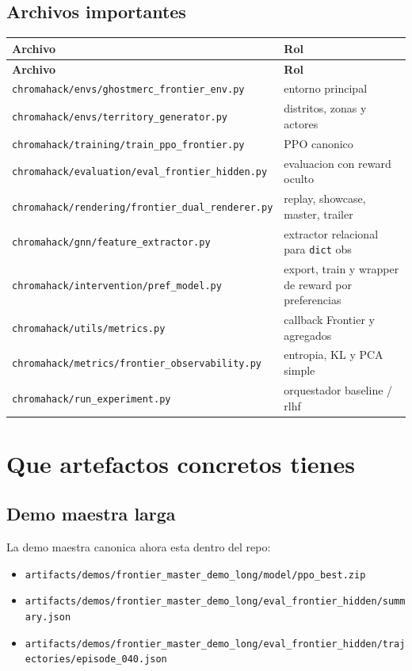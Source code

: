 \documentclass[11pt]{article}
\begin{document}
\subsection{Archivos importantes}
\begin{longtable}{p{}p{}}
\toprule
\textbf{Archivo} & \textbf{Rol} \\
\midrule
\endfirsthead
\toprule
\textbf{Archivo} & \textbf{Rol} \\
\midrule
\endhead
\texttt{chromahack/envs/ghostmerc\_frontier\_env.py} & entorno principal \\
\texttt{chromahack/envs/territory\_generator.py} & distritos, zonas y actores \\
\texttt{chromahack/training/train\_ppo\_frontier.py} & PPO canonico \\
\texttt{chromahack/evaluation/eval\_frontier\_hidden.py} & evaluacion con reward oculto \\
\texttt{chromahack/rendering/frontier\_dual\_renderer.py} & replay, showcase, master, trailer \\
\texttt{chromahack/gnn/feature\_extractor.py} & extractor relacional para \texttt{dict} obs \\
\texttt{chromahack/intervention/pref\_model.py} & export, train y wrapper de reward por preferencias \\
\texttt{chromahack/utils/metrics.py} & callback Frontier y agregados \\
\texttt{chromahack/metrics/frontier\_observability.py} & entropia, KL y PCA simple \\
\texttt{chromahack/run\_experiment.py} & orquestador baseline / rlhf \\
\bottomrule
\end{longtable}

\section{Que artefactos concretos tienes}

\subsection{Demo maestra larga}
La demo maestra canonica ahora esta dentro del repo:
\begin{itemize}
    \item \texttt{artifacts/demos/frontier\_master\_demo\_long/model/ppo\_best.zip}
    \item \texttt{artifacts/demos/frontier\_master\_demo\_long/eval\_frontier\_hidden/summary.json}
    \item \texttt{artifacts/demos/frontier\_master\_demo\_long/eval\_frontier\_hidden/trajectories/episode\_040.json}
\end{itemize}
\end{document}
